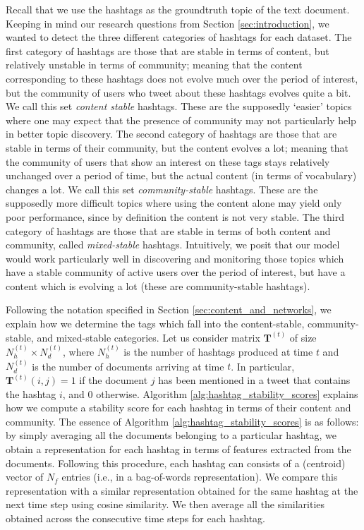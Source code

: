 Recall that we use the hashtags as the groundtruth
topic of the text document.
Keeping in mind our research questions from Section \ref{sec:introduction}, we wanted to detect the three different
categories of hashtags for each dataset.
The first category of hashtags are those that are stable in terms of content, but relatively unstable in terms of community; 
meaning that the content corresponding to these hashtags does not evolve much over the period of interest, but the community
of users who tweet about these hashtags evolves quite a bit.
We call this set \emph{content stable} hashtags.  These are the supposedly `easier' topics where one may expect
that the presence of community may not particularly help in better topic discovery.
The second category of hashtags are those that are stable in terms of their community, but the content evolves a lot;
meaning that the community of users that show an interest on these tags stays relatively unchanged over a period of time,
but the actual content (in terms of vocabulary) changes a lot.
We call this set \emph{community-stable} hashtags.  These are the supposedly more difficult topics where using
the content alone may yield only poor performance, since by definition the content is not very stable.
The third category of hashtags are those that are stable in terms of both content and community, called \emph{mixed-stable}
hashtags.  
Intuitively, we posit that our model would work particularly well in discovering and monitoring those topics which 
have a stable community of active users over the period
of interest, but have a content which is evolving a lot (these are community-stable hashtags).

Following the notation specified in Section \ref{sec:content_and_networks}, we explain how we determine the 
tags which fall into the content-stable, community-stable, and mixed-stable categories.
Let us consider matrix $\mathbf{T}^{(t)}$ of size $N_h^{(t)} \times N_d^{(t)}$, 
where  $N_h^{(t)}$ is the number of hashtags produced at time $t$ and 
$N_d^{(t)}$ is the number of documents arriving at time $t$.
In particular, $\mathbf{T}^{(t)}(i,j) = 1$ if the document $j$ has been mentioned in a tweet
that contains the hashtag $i$, and $0$ otherwise.  Algorithm \ref{alg:hashtag_stability_scores} explains
how we compute a stability score for each hashtag in terms of their content and community. The essence of Algorithm
\ref{alg:hashtag_stability_scores} is as follows: by simply averaging all the documents belonging to a particular
hashtag, we obtain a representation for each hashtag in terms of features extracted from the documents. Following this procedure, each hashtag can consists of a (centroid) vector of  $N_f$ entries (i.e., in a bag-of-words representation).  We compare this representation with a similar
representation obtained for the same hashtag at the next time step using cosine similarity.  We then average
all the similarities obtained across the consecutive time steps for each hashtag.

